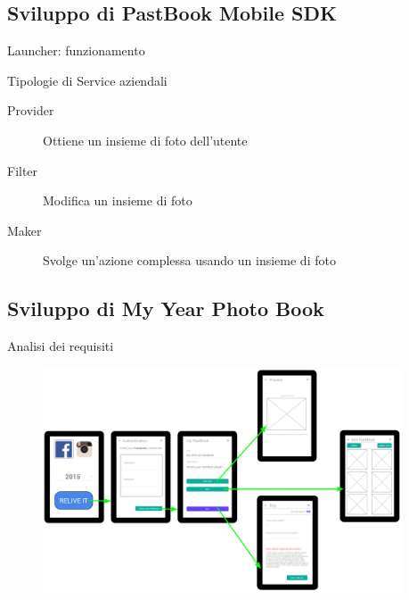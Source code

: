 	\subsection{Sviluppo di PastBook Mobile SDK}
		\begin{frame}{Launcher: funzionamento}
			\fontsize{8pt}{7}\selectfont
			\begin{block}{Tipologie di Service aziendali}
				\begin{description}
					\item[Provider] Ottiene un insieme di foto dell'utente
					\item[Filter] Modifica un insieme di foto
					\item[Maker] Svolge un'azione complessa usando un insieme di foto	
				\end{description}
			\end{block}
			
		\end{frame}
	\subsection{Sviluppo di My Year Photo Book}
		\begin{frame}{Analisi dei requisiti}
			\begin{figure}[H]
				\centering
				\includegraphics[width=0.95\textwidth]{capitolo_3/immagini/wireframe.png}
			\end{figure}
		\end{frame}
